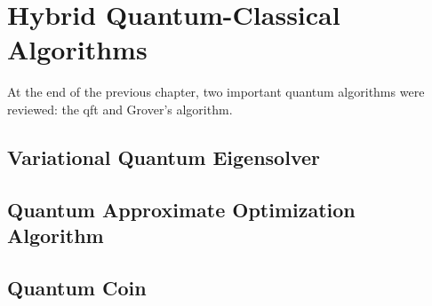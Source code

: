 \chapter[Hybrid Quantum-Classical Algorithms]{Hybrid Quantum-Classical\\Algorithms} \label{chap:hybrid-quantum-classical-algorithms}
At the end of the previous chapter, two important quantum algorithms were reviewed: the \gls{qft} and Grover's algorithm.

\section{Variational Quantum Eigensolver}

\section{Quantum Approximate Optimization Algorithm}

\section{Quantum Coin}